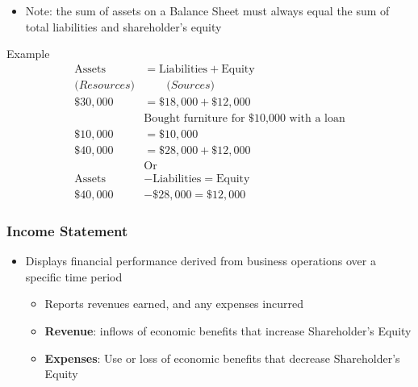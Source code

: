 \documentclass{article}
\begin{document}
\begin{itemize}
\begin{itemize}
\begin{itemize}
								\item What belongs to the owners, the "net assets" of the company (what would be left if all liabilities were paid for and all assets sold \colorbox{pastel_purple}{($SE = A-L$))}
								\item Consists of:
									\begin{itemize}
										\item Share capital
										\item Retained profits
									\end{itemize}
							\end{itemize}
					\end{itemize}
				\item \colorbox{pastel_red}{Note:} the sum of assets on a Balance Sheet must always equal the sum of total liabilities and shareholder's equity
			\end{itemize}

			\begin{question}{Example}
				\begin{align*}
					\text{Assets} &= \text{Liabilities} + \text{Equity} 			\\
					\textit{(Resources)} &\qquad \textit{(Sources)}					\\
					\$30,000 &= \$18,000 + \$12,000									\\
							 & \text{Bought furniture for \$10,000 with a loan}		\\
					\$10,000 &= \$10,000											\\
					\$40,000 &= \$28,000 + \$12,000									\\
							 & \text{Or}											\\
					\text{Assets} &- \text{Liabilities} = \text{Equity}				\\
					\$40,000 &- \$28,000 = \$12,000
				\end{align*}
			\end{question}
		
		\subsubsection{Income Statement}
			\begin{itemize}
				\item Displays financial performance derived from business operations over a specific time period
					\begin{itemize}
						\item Reports revenues earned, and any expenses incurred
						\item \textbf{Revenue}: inflows of economic benefits that increase Shareholder's Equity
						\item \textbf{Expenses}: Use or loss of economic benefits that decrease Shareholder's Equity
					\end{itemize}
			\end{itemize}
\end{document}
